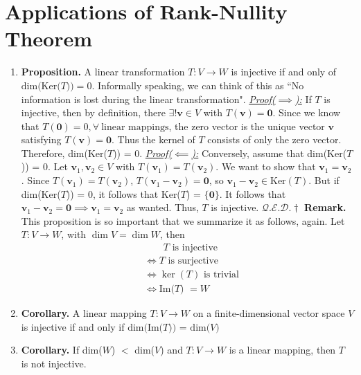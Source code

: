 \documentclass[oneside, 12pt]{book}
\newcommand{\settag}[1]{\renewcommand{\theenumi}{#1}}
\newcommand{\qed}{\hfill $\mathcal{Q}.\mathcal{E}.\mathcal{D}.\dagger$}
\newcommand{\tbf}[1]{\textbf{#1}}
\newcommand{\tit}[1]{\textit{#1}}
\newcommand{\proofforward}{\tit{\underline{Proof($\implies$):}}}
\newcommand{\proofback}{\tit{\underline{Proof($\impliedby$):}}}
\newcommand{\trans}[3]{$#1:#2\rightarrow{}#3$}
\newcommand{\para}[1]{\item \tbf{#1}}
\newcommand{\vv}{\mathbf{v}}
\newcommand{\vzero}{\mathbf{0}}
\begin{document}
\section{Applications of Rank-Nullity Theorem}
    \begin{enumerate}
        \settag{2.4.2}
        \para{Proposition.} A linear transformation $T:V\rightarrow{} W$ is injective if and only of $\text{dim(Ker}(T\text{))}=0$. Informally speaking, we can think of this as ``No information is lost during the linear transformation". \newline
        \proofforward \newline
            If $T$ is injective, then by definition, there $\exists!\vv \in V$ with $T(\vv) = \vzero$. Since we know that $T(\vzero) = 0, \forall~\text{linear mappings}$, the zero vector is the unique vector $\vv$ satisfying $T(\vv) = \vzero$. Thus the kernel of $T$ consists of only the zero vector. Therefore, dim(Ker($T$)) = 0. \newline
        \proofback \newline
            Conversely, assume that dim(Ker($T$)) = 0. Let $\vv_1, \vv_2 \in V$ with $T(\vv_1) = T(\vv_2)$. We want to show that $\vv_1 = \vv_2$. Since $T(\vv_1) = T(\vv_2)$, $T(\vv_1 - \vv_2) = \vzero$, so $\vv_1 - \vv_2 \in \text{Ker}(T)$. But if dim(Ker($T$)) = 0, it follows that Ker($T$) = $\{\vzero\}$. It follows that $\vv_1 - \vv_2 = \vzero \implies \vv_1 = \vv_2$ as wanted. Thus, $T$ is injective. \qed \newline
        \textbf{Remark.} This proposition is so important that we summarize it as follows, again. Let \trans{T}{V}{W}, with $\dim{V} = \dim{W}$, then
        \begin{align*}
            &~~~~~~~~~ \text{$T$ is injective} \\
            &\iff \text{$T$ is surjective} \\
            &\iff \text{$\ker(T)$ is trivial} \\
            &\iff \text{Im($T$) $= W$}
        \end{align*}
        
        \settag{2.4.3}
        \para{Corollary.} A linear mapping $T:V\rightarrow{} W$ on a finite-dimensional vector space $V$ is injective if and only if $\text{dim(Im(}T\text{)) = dim(}V\text{)}$
        
        \settag{2.4.4}
        \para{Corollary.} If dim($W$) $<$ dim($V$) and \trans{T}{V}{W} is a linear mapping, then $T$ is not injective.
        

\end{enumerate}
\end{document}
